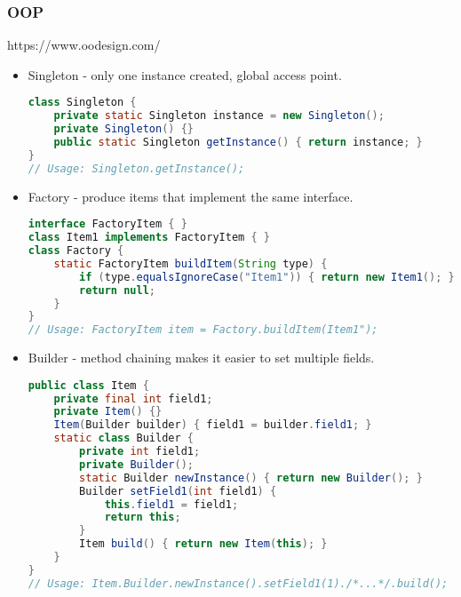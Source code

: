 \documentclass[10pt]{article}
\begin{document}
\subsubsection{OOP}
https://www.oodesign.com/
\begin{itemize}
    \item Singleton - only one instance created, global access point.
\begin{lstlisting}[language=java]
class Singleton {
    private static Singleton instance = new Singleton();
    private Singleton() {}
    public static Singleton getInstance() { return instance; }
}
// Usage: Singleton.getInstance();
\end{lstlisting}
    \item Factory - produce items that implement the same interface.
\begin{lstlisting}[language=java]
interface FactoryItem { }
class Item1 implements FactoryItem { }
class Factory {
    static FactoryItem buildItem(String type) {
        if (type.equalsIgnoreCase("Item1")) { return new Item1(); }
        return null;
    }
}
// Usage: FactoryItem item = Factory.buildItem(Item1");
\end{lstlisting}
    \item Builder - method chaining makes it easier to set multiple fields.
\begin{lstlisting}[language=java]
public class Item {
    private final int field1;
    private Item() {}
    Item(Builder builder) { field1 = builder.field1; }
    static class Builder {
        private int field1;
        private Builder();
        static Builder newInstance() { return new Builder(); }
        Builder setField1(int field1) {
            this.field1 = field1;
            return this;
        }
        Item build() { return new Item(this); }
    }
}
// Usage: Item.Builder.newInstance().setField1(1)./*...*/.build();
\end{lstlisting}


\end{itemize}
\end{document}
